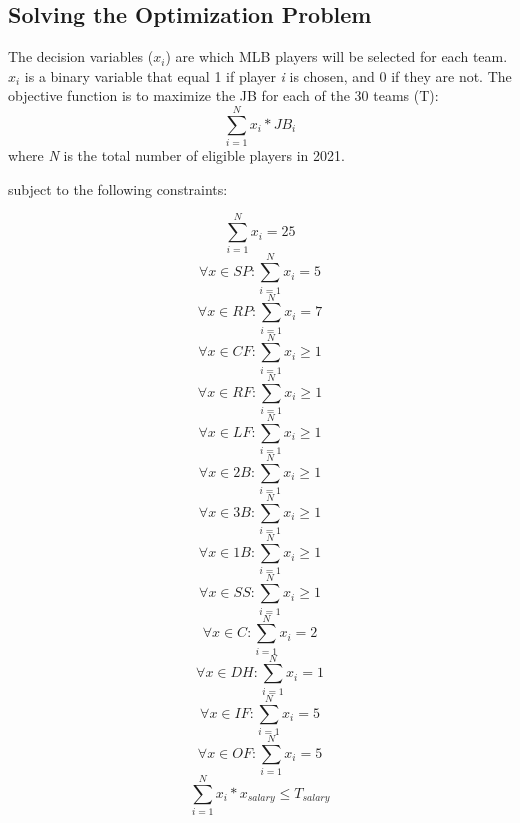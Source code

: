 \documentclass{article}
\begin{document}
\subsection{Solving the Optimization Problem}

The decision variables ($x_{i}$) are which MLB players will be selected for each team. $x_{i}$ is a binary variable that equal 1 if player \emph{i} is chosen, and 0 if they are not. The objective function is to maximize the JB for each of the 30 teams (T):
\begin{equation}
\sum_{i = 1}^{N} x_{i} * JB_{i}
\end{equation} where \emph{N} is the total number of eligible players in 2021.

subject to the following constraints:

\begin{equation}
\sum_{i = 1}^{N} x_{i} = 25
\end{equation}
\begin{equation}
\forall x \in SP:  \sum_{i = 1}^{N} x_{i} = 5
\end{equation}
\begin{equation}
\forall x \in RP:  \sum_{i = 1}^{N} x_{i} = 7 
\end{equation}
\begin{equation} 
\forall x \in CF:  \sum_{i = 1}^{N} x_{i} \geq 1
\end{equation}
\begin{equation} 
\forall x \in RF:  \sum_{i = 1}^{N} x_{i} \geq 1 
\end{equation}
\begin{equation} 
\forall x \in LF:  \sum_{i = 1}^{N} x_{i} \geq 1 
\end{equation}
\begin{equation} 
\forall x \in 2B:  \sum_{i = 1}^{N} x_{i} \geq 1 
\end{equation}
\begin{equation} 
\forall x \in 3B:  \sum_{i = 1}^{N} x_{i} \geq 1
\end{equation} 
\begin{equation} 
\forall x \in 1B:  \sum_{i = 1}^{N} x_{i} \geq 1 
\end{equation}
\begin{equation} 
\forall x \in SS:  \sum_{i = 1}^{N} x_{i} \geq 1 
\end{equation}
\begin{equation} 
\forall x \in C:  \sum_{i = 1}^{N} x_{i} = 2 
\end{equation}
\begin{equation}
\forall x \in DH:  \sum_{i = 1}^{N} x_{i} = 1 
\end{equation}
\begin{equation} 
\forall x \in IF:  \sum_{i = 1}^{N} x_{i} = 5 
\end{equation}
\begin{equation} 
\forall x \in OF:  \sum_{i = 1}^{N} x_{i} = 5
\end{equation}
\begin{equation}
\sum_{i = 1}^{N} x_{i} * x_{salary} \leq T_{salary}
\end{equation}
\end{document}
